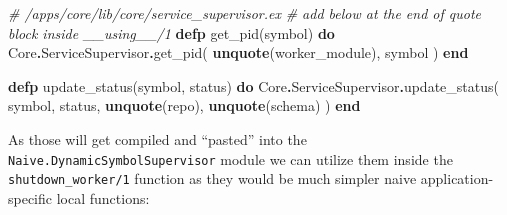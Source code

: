 \documentclass[
]{book}
\newenvironment{Shaded}{\begin{snugshade}}{\end{snugshade}}
\newcommand{\CommentTok}[1]{\textcolor[rgb]{0.56,0.35,0.01}{\textit{#1}}}
\newcommand{\ConstantTok}[1]{\textcolor[rgb]{0.00,0.00,0.00}{#1}}
\newcommand{\KeywordTok}[1]{\textcolor[rgb]{0.13,0.29,0.53}{\textbf{#1}}}
\newcommand{\NormalTok}[1]{#1}
\newcommand{\OperatorTok}[1]{\textcolor[rgb]{0.81,0.36,0.00}{\textbf{#1}}}
\begin{document}
\begin{Shaded}
\begin{Highlighting}[]
      \CommentTok{\# /apps/core/lib/core/service\_supervisor.ex}
      \CommentTok{\# add below at the end of \textasciigrave{}quote\textasciigrave{} block inside \textasciigrave{}\_\_using\_\_/1\textasciigrave{}}
      \KeywordTok{defp}\NormalTok{ get\_pid(symbol) }\KeywordTok{do}
        \ConstantTok{Core}\OperatorTok{.}\ConstantTok{ServiceSupervisor}\OperatorTok{.}\NormalTok{get\_pid(}
          \KeywordTok{unquote}\NormalTok{(worker\_module),}
\NormalTok{          symbol}
\NormalTok{        )}
      \KeywordTok{end}

      \KeywordTok{defp}\NormalTok{ update\_status(symbol, status) }\KeywordTok{do}
        \ConstantTok{Core}\OperatorTok{.}\ConstantTok{ServiceSupervisor}\OperatorTok{.}\NormalTok{update\_status(}
\NormalTok{          symbol,}
\NormalTok{          status,}
          \KeywordTok{unquote}\NormalTok{(repo),}
          \KeywordTok{unquote}\NormalTok{(schema)}
\NormalTok{        )}
      \KeywordTok{end}
\end{Highlighting}
\end{Shaded}

As those will get compiled and ``pasted'' into the \texttt{Naive.DynamicSymbolSupervisor} module we can utilize them inside the \texttt{shutdown\_worker/1} function as they would be much simpler naive application-specific local functions:
\end{document}
